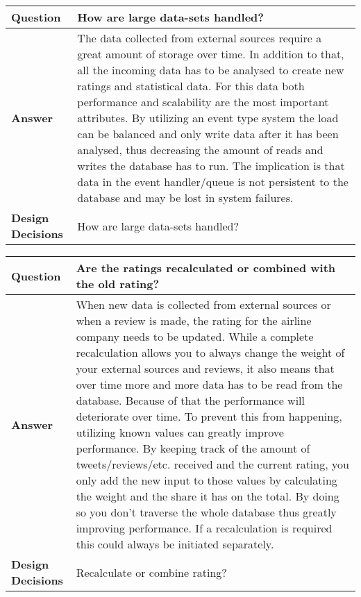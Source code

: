 \begin{longtable}{| l |  p{12cm} |}
\hline
\textbf{Question} & \textbf{How are large data-sets handled?} \\ \hline
\textbf{Answer} &
The data collected from external sources require a great amount of storage over time. In addition to that, all the incoming data has to be analysed to create new ratings and statistical data. For this data both performance and scalability are the most important attributes.
By utilizing an event type system the load can be balanced and only write data after it has been analysed, thus decreasing the amount of reads and writes the database has to run. The implication is that data in the event handler/queue is not persistent to the database and may be lost in system failures.
 \\ \hline
\textbf{Design Decisions} & How are large data-sets handled? \\ \hline
\end{longtable}


\begin{longtable}{| l |  p{12cm} |}
\hline
\textbf{Question} & \textbf{ Are the ratings recalculated or combined with the old rating? } \\ \hline
\textbf{Answer} & When new data is collected from external sources or when a review is made, the rating for the airline company needs to be updated. While a complete recalculation allows you to always change the weight of your external sources and reviews, it also means that over time more and more data has to be read from the database. Because of that the performance will deteriorate over time.
To prevent this from happening, utilizing known values can greatly improve performance. By keeping track of the amount of tweets/reviews/etc. received and the current rating, you only add the new input to those values by calculating the weight and the share it has on the total. By doing so you don't traverse the whole database thus greatly improving performance. If a recalculation is required this could always be initiated separately.
 \\ \hline
\textbf{Design Decisions} & Recalculate or combine rating? \\ \hline
\end{longtable}

